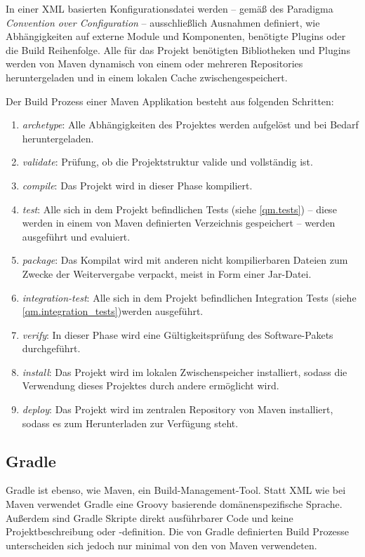 			 In einer XML basierten Konfigurationsdatei werden -- gemäß des Paradigma \textit{Convention over Configuration} -- ausschließlich Ausnahmen definiert, wie Abhängigkeiten auf externe Module und Komponenten, benötigte Plugins oder die Build Reihenfolge. Alle für das Projekt benötigten Bibliotheken und Plugins werden von Maven dynamisch von einem oder mehreren Repositories heruntergeladen und in einem lokalen Cache zwischengespeichert. \cite{Company.2009}
			 
			 Der Build Prozess einer Maven Applikation besteht aus folgenden Schritten:
			 
			 \begin{enumerate}
			 	\item \textit{archetype}: Alle Abhängigkeiten des Projektes werden aufgelöst und bei Bedarf heruntergeladen.
			 	\item \textit{validate}: Prüfung, ob die Projektstruktur valide und vollständig ist.
			 	\item \textit{compile}: Das Projekt wird in dieser Phase kompiliert. 
			 	\item \textit{test}: Alle sich in dem Projekt befindlichen Tests (siehe \autoref{qm.tests}) -- diese werden in einem von Maven definierten Verzeichnis gespeichert -- werden ausgeführt und evaluiert.
			 	\item \textit{package}: Das Kompilat wird mit anderen nicht kompilierbaren Dateien zum Zwecke der Weitervergabe verpackt, meist in Form einer Jar-Datei.
			 	\item \textit{integration-test}: Alle sich in dem Projekt befindlichen Integration Tests (siehe \autoref{qm.integration_tests})werden ausgeführt. 
			 	\item \textit{verify}: In dieser Phase wird eine Gültigkeitsprüfung des Software-Pakets durchgeführt.
			 	\item \textit{install}: Das Projekt wird im lokalen Zwischenspeicher installiert, sodass die Verwendung dieses Projektes durch andere ermöglicht wird. 
			 	\item \textit{deploy}: Das Projekt wird im zentralen Repository von Maven installiert, sodass es zum Herunterladen zur Verfügung steht. 
			 \end{enumerate}
			 
		\subsection{Gradle}
			
			Gradle ist ebenso, wie Maven, ein Build-Management-Tool. Statt XML wie bei Maven verwendet Gradle eine Groovy basierende domänenspezifische Sprache. Außerdem sind Gradle Skripte direkt ausführbarer Code und keine Projektbeschreibung oder -definition. Die von Gradle definierten Build Prozesse unterscheiden sich jedoch nur minimal von den von Maven verwendeten. 
			
